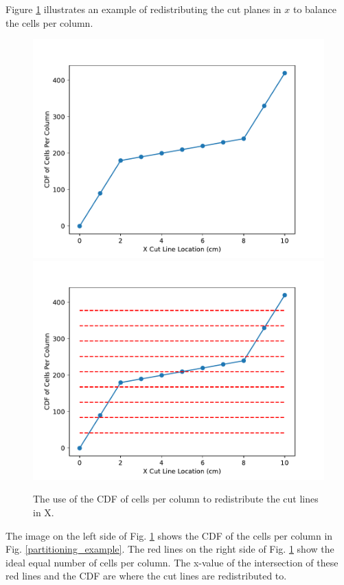 Figure \ref{redistribute} illustrates an example of redistributing the cut planes in $x$ to balance the cells per column.
\begin{figure}[H]
\centering
\includegraphics[scale=0.4]{../figures/spiderweb_redistribute_before_sparse.pdf}
\includegraphics[scale=0.4]{../figures/spiderweb_redistribute_after_sparse.pdf}
\caption{The use of the CDF of cells per column to redistribute the cut lines in X.}
\label{redistribute}
\end{figure}
The image on the left side of Fig. \ref{redistribute} shows the CDF of the cells per column in Fig. \ref{partitioning_example}. The red lines on the right side of Fig. \ref{redistribute} show the ideal equal number of cells per column. The x-value of the intersection of these red lines and the CDF are where the cut lines are redistributed to. 


